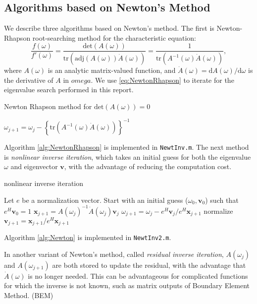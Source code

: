 \documentclass[11pt,letterpaper]{article}
\newcommand{\diff}{\mathrm{d}}
\begin{document}
\subsection{Algorithms based on Newton's Method}
We describe three algorithms based on Newton's method. 
The first is Newton-Rhapson root-searching method for the characteristic equation: 
\begin{equation}\label{eq:NewtonRhapson}
\frac{f(\omega)}{f'(\omega)} = \frac{\mathrm{det}(A(\omega))}{ \mathrm{tr} \left( \mathrm{adj}(A(\omega))\dot{A}(\omega)\right)} = \frac{1}{ \mathrm{tr}\left( A^{-1}(\omega)\dot{A}(\omega)\right)},
\end{equation}
where $A(\omega)$ is an analytic matrix-valued function, and $\dot{A}(\omega)=\diff A(\omega)/\diff \omega$ is the derivative of $A$ in $omega$. We use \ref{eq:NewtonRhapson} to iterate for the eigenvalue search performed in this report. 
\begin{algorithm}
\caption{Newton Rhapson method for $\mathrm{det}(A(\omega))=0$}
\label{alg:NewtonRhapson}
\begin{algorithmic}
\STATE $\omega_{j+1} = \omega_j - \left\lbrace \mathrm{tr}\left( A^{-1}(\omega)\dot{A}(\omega)\right)\right\rbrace^{-1} $
\ENDFOR
\end{algorithmic}
\end{algorithm}
Algorithm \ref{alg:NewtonRhapson} is implemented in {\tt NewtInv.m}. 
The next method is {\it nonlinear inverse iteration}, \citep{anselone_solution_1968} which takes an initial guess for both the eigenvalue $\omega$ and eigenvector $\mathbf{v}$, with the advantage of reducing the computation cost. 
\begin{algorithm}
\caption{nonlinear inverse iteration}
\label{alg:Newton}
\begin{algorithmic}
\STATE Let $e$ be a normalization vector. Start with an initial guess ($\omega_0, \mathbf{v}_0$) such that $e^{H}\mathbf{v}_0=1$ 
\STATE $\mathbf{x}_{j+1} = A(\omega_j)^{-1} \dot{A}(\omega_j)\mathbf{v}_j$
\STATE $\omega_{j+1} = \omega_j - e^H\mathbf{v}_j/e^H\mathbf{x}_{j+1} $
\STATE normalize $\mathbf{v}_{j+1}=\mathbf{x}_{j+1}/e^{H}\mathbf{x}_{j+1}$
\ENDFOR
\end{algorithmic}
\end{algorithm}
Algorithm \ref{alg:Newton} is implemented in {\tt NewtInv2.m}. 

In another variant of Newton's method, called {\it residual inverse iteration}, \citep{neumaier1985residual} $A(\omega_j)$ and $A(\omega_{j+1})$ are both stored to update the residual, with the advantage that $\dot{A}(\omega)$ is no longer needed. This can be advantageous for complicated functions for which the inverse is not known, such as matrix outputs of Boundary Element Method. (BEM)
\end{document}
